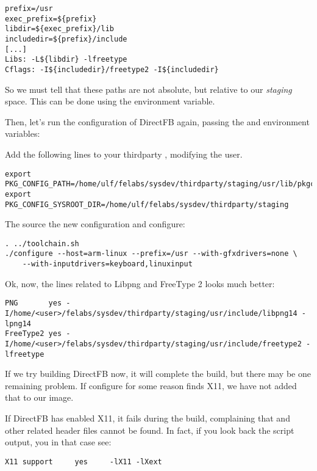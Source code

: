 \begin{verbatim}
prefix=/usr
exec_prefix=${prefix}
libdir=${exec_prefix}/lib
includedir=${prefix}/include
[...]
Libs: -L${libdir} -lfreetype
Cflags: -I${includedir}/freetype2 -I${includedir}
\end{verbatim}

So we must tell  that these paths are not absolute,
but relative to our {\em staging} space. This can be done using the
 environment variable.

Then, let's run the configuration of DirectFB again, passing the
 and  environment
variables:

Add the following lines to your thirdparty , modifying the user.

\begin{verbatim}
export PKG_CONFIG_PATH=/home/ulf/felabs/sysdev/thirdparty/staging/usr/lib/pkgconfig
export PKG_CONFIG_SYSROOT_DIR=/home/ulf/felabs/sysdev/thirdparty/staging
\end{verbatim}

The source the new configuration and configure:

\begin{verbatim}
. ../toolchain.sh
./configure --host=arm-linux --prefix=/usr --with-gfxdrivers=none \
	--with-inputdrivers=keyboard,linuxinput
\end{verbatim}

Ok, now, the lines related to Libpng and FreeType 2 looks much better:

\footnotesize
\begin{verbatim}
PNG       yes -I/home/<user>/felabs/sysdev/thirdparty/staging/usr/include/libpng14 -lpng14
FreeType2 yes -I/home/<user>/felabs/sysdev/thirdparty/staging/usr/include/freetype2 -lfreetype
\end{verbatim}
\normalsize

If we try building DirectFB now, it will complete the build, but there may be one
remaining problem. If configure for some reason finds X11, we have not added that to our image.

If DirectFB has enabled X11, it fails during the build, complaining
that \code{X11/Xlib.h} and other related header files cannot be
found. In fact, if you look back the  script output,
you in that case see:

\begin{verbatim}
X11 support		yes		-lX11 -lXext
\end{verbatim}

